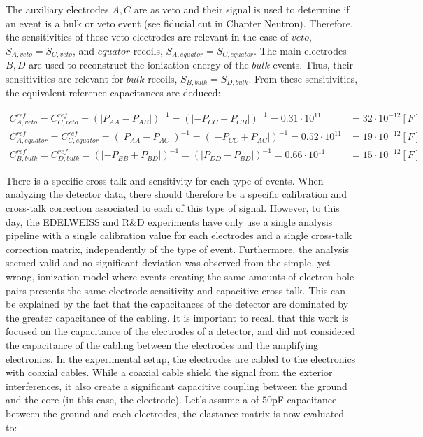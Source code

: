 The auxiliary electrodes $A,C$ are as veto and their signal is used to determine if an event is a bulk or veto event (see fiducial cut in Chapter Neutron). Therefore, the sensitivities of these veto electrodes are relevant in the case of $veto$, $S_{A, veto}=S_{C, veto}$, and $equator$ recoils, $S_{A, equator}=S_{C, equator}$. The main electrodes $B,D$ are used to reconstruct the ionization energy of the $bulk$ events. Thus, their sensitivities are relevant for $bulk$ recoils, $S_{B, bulk}=S_{D, bulk}$. From these sensitivities, the equivalent reference capacitances are deduced:

\begin{align}
C_{A, veto}^{ref} = C_{C, veto}^{ref}
= \left( | P_{AA} - P_{AB} |\right)^{-1}
= \left( | -P_{CC} + P_{CB} |\right)^{-1}
= 0.31 \cdot 10^{11}
&= 32 \cdot 10^{-12} [F]
\\
C_{A, equator}^{ref} = C_{C, equator}^{ref}
= \left( | P_{AA} - P_{AC} |\right)^{-1}
= \left( | -P_{CC} + P_{AC} |\right)^{-1}
= 0.52 \cdot 10^{11}
&= 19 \cdot 10^{-12} [F]
\\
C_{B, bulk}^{ref} = C_{D, bulk}^{ref}
= \left( | -P_{BB} + P_{BD} |\right)^{-1}
= \left( | P_{DD} - P_{BD} |\right)^{-1}
= 0.66 \cdot 10^{11}
&= 15 \cdot 10^{-12} [F]
\end{align}

There is a specific cross-talk and sensitivity for each type of events. When analyzing the detector data, there should therefore be a specific calibration and cross-talk correction associated to each of this type of signal.
However, to this day, the EDELWEISS and R\&D experiments have only use a single analysis pipeline with a single calibration value for each electrodes and a single cross-talk correction matrix, independently of the type of event. Furthermore, the analysis seemed valid and no significant deviation was observed from the simple, yet wrong, ionization model where events creating the same amounts of electron-hole pairs presents the same electrode sensitivity and capacitive cross-talk. This can be explained by the fact that the capacitances of the detector are dominated by the greater capacitance of the cabling. It is important to recall that this work is focused on the capacitance of the electrodes of a detector, and did not considered the capacitance of the cabling between the electrodes and the amplifying electronics. In the experimental setup, the electrodes are cabled to the electronics with coaxial cables. While a coaxial cable shield the signal from the exterior interferences, it also create a significant capacitive coupling between the ground and the core (in this case, the electrode). Let's assume a of $50$pF capacitance between the ground and each electrodes, the elastance matrix is now evaluated to:

